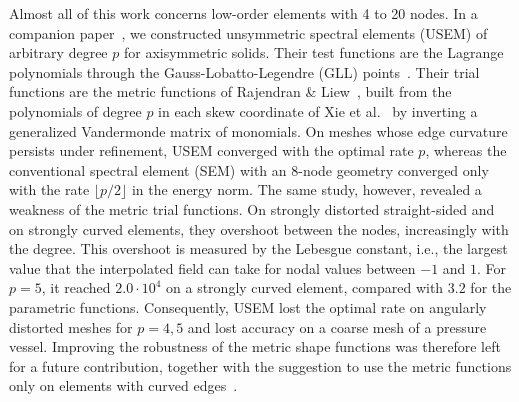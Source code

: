 Almost all of this work concerns low-order elements with 4 to 20 nodes. In a companion paper~\cite{Eisentraeger2026axisymmetric}, we constructed unsymmetric spectral elements (USEM) of arbitrary degree $p$ for axisymmetric solids. Their test functions are the Lagrange polynomials through the Gauss-Lobatto-Legendre (GLL) points~\cite{Patera1984spectral,Ronquist1987legendre,Karniadakis2005spectral}. Their trial functions are the metric functions of Rajendran \& Liew~\cite{Rajendran2003novel}, built from the polynomials of degree $p$ in each skew coordinate of Xie et al.~\cite{Xie2016Modified} by inverting a generalized Vandermonde matrix of monomials. On meshes whose edge curvature persists under refinement, USEM converged with the optimal rate $p$, whereas the conventional spectral element (SEM) with an 8-node geometry converged only with the rate $\lfloor p/2\rfloor$ in the energy norm. The same study, however, revealed a weakness of the metric trial functions. On strongly distorted straight-sided and on strongly curved elements, they overshoot between the nodes, increasingly with the degree. This overshoot is measured by the Lebesgue constant, i.e., the largest value that the interpolated field can take for nodal values between $-1$ and $1$. For $p=5$, it reached $2.0\cdot10^4$ on a strongly curved element, compared with $3.2$ for the parametric functions. Consequently, USEM lost the optimal rate on angularly distorted meshes for $p=4,5$ and lost accuracy on a coarse mesh of a pressure vessel. Improving the robustness of the metric shape functions was therefore left for a future contribution, together with the suggestion to use the metric functions only on elements with curved edges~\cite{Eisentraeger2026axisymmetric}.


